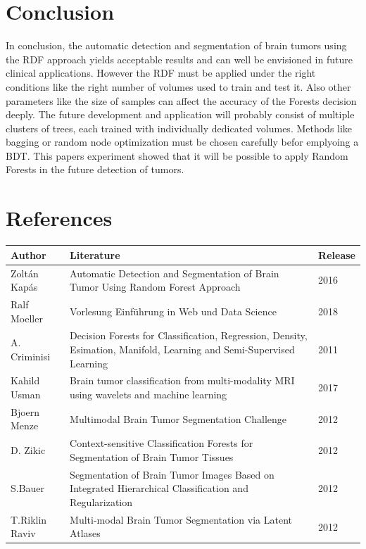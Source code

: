\documentclass[
12pt,
headsepline,
bibliography=totoc,
twoside=semi,
fleqn
]{scrartcl}
\begin{document}
\section{Conclusion\label{sec:sec5}}

  In conclusion, the automatic detection and segmentation of brain tumors using the RDF approach yields acceptable results and can well be envisioned in future clinical applications. However the RDF must be applied under the right conditions like the right number of volumes used to train and test it. Also other parameters like the size of samples can affect the accuracy of the Forests decision deeply. The future development and application will probably consist of multiple clusters of trees, each trained with individually dedicated volumes. Methods like bagging or random node optimization must be chosen carefully befor emplyoing a BDT. This papers experiment showed that it will be possible to apply Random Forests in the future detection of tumors. 


\section{References\label{sec.sec5}}




\begin{table}[H]
 \footnotesize
 \vspace{1ex}
 \centering 
 \begin{tabular}{p{2.5cm}p{8.7cm}p{2.8cm}}
 \toprule
 \textbf{Author} & \textbf{Literature} & \textbf{Release} \\
 \midrule
 Zoltán Kapás & Automatic Detection and Segmentation of Brain Tumor Using Random Forest Approach & 2016 \\
 Ralf Moeller & Vorlesung Einführung in Web und Data Science & 2018 \\
 A. Criminisi & Decision Forests for Classification, Regression, Density, Esimation, Manifold, Learning and Semi-Supervised Learning & 2011 \\
 Kahild Usman & Brain tumor classification from multi-modality MRI using wavelets and machine learning & 2017 \\
 Bjoern Menze&Multimodal Brain Tumor Segmentation Challenge&2012\\
 D. Zikic&Context-sensitive Classification Forests for Segmentation of Brain Tumor Tissues&2012\\
 S.Bauer&Segmentation of Brain Tumor Images Based on Integrated Hierarchical Classification and Regularization&2012\\
 T.Riklin Raviv&Multi-modal Brain Tumor Segmentation via Latent Atlases&2012


 \end{tabular}
 \vspace{2ex}
\end{table}


%
%
\end{document}
